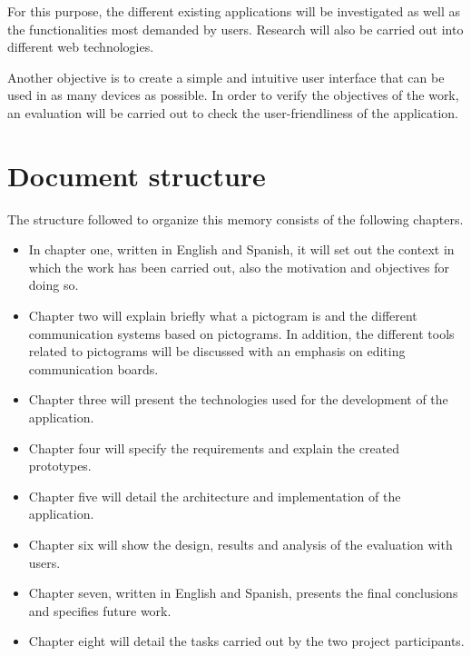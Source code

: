For this purpose, the different existing applications will be investigated as well as the functionalities most demanded by users. Research will also be carried out into different web technologies.

Another objective is to create a simple and intuitive user interface that can be used in as many devices as possible. In order to verify the objectives of the work, an evaluation will be carried out to check the user-friendliness of the application. 


\section{Document structure}
\label{cap1:sec:mem}

The structure followed to organize this memory consists of the following chapters.
\begin{itemize}
	\item In chapter one, written in English and Spanish, it will set out the context in which the work has been carried out, also the motivation and objectives for doing so.
	
	\item Chapter two will explain briefly what a pictogram is and the different communication systems based on pictograms. In addition, the different tools related to pictograms will be discussed with an emphasis on editing communication boards.
	
	\item Chapter three will present the technologies used for the development of the application.
	
	\item Chapter four will specify the requirements and explain the created prototypes.
	
	\item Chapter five will detail the architecture and implementation of the application.
	
	\item Chapter six will show the design, results and analysis of the evaluation with users. 
	
	\item Chapter seven, written in English and Spanish, presents the final conclusions and specifies future work.
	
	\item Chapter eight will detail the tasks carried out by the two project participants.
\end{itemize}	




